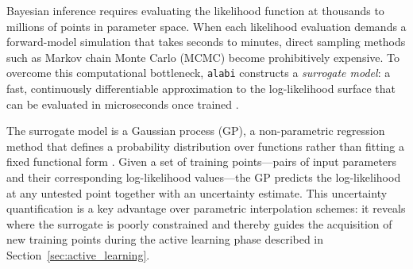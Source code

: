 Bayesian inference requires evaluating the likelihood function at
thousands to millions of points in parameter space. When each
likelihood evaluation demands a forward-model simulation that takes
seconds to minutes, direct sampling methods such as Markov chain Monte
Carlo (MCMC) become prohibitively expensive. To overcome this
computational bottleneck, \texttt{alabi} constructs a \emph{surrogate
model}: a fast, continuously differentiable approximation to the
log-likelihood surface that can be evaluated in microseconds once
trained \citep{Luger2017,Fleming2024}.

The surrogate model is a Gaussian process (GP), a non-parametric
regression method that defines a probability distribution over
functions rather than fitting a fixed functional form
\citep{Rasmussen2006}. Given a set of training points---pairs of
input parameters and their corresponding log-likelihood values---the
GP predicts the log-likelihood at any untested point together with an
uncertainty estimate. This uncertainty quantification is a key
advantage over parametric interpolation schemes: it reveals where the
surrogate is poorly constrained and thereby guides the acquisition of
new training points during the active learning phase described in
Section~\ref{sec:active_learning}.

